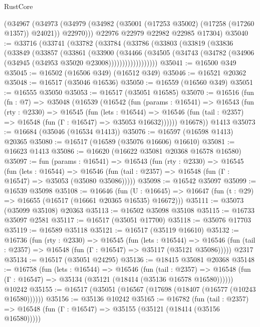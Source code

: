 \begin{lexlean}{RustCore}
\begin{coremodule}
      (@34967
        (@34973 (@34979 (@34982 (@35001 (@17253 @35002) (@17258 (@17260 @1357)) @24021)) @22970)))
      @22976
      @22979
      @22982
      @22985
      @17304)
@35040 := @33716
    (@33741
      (@33782
        (@33784
          (@33786
            (@33803
              (@33819
                (@33836
                  (@33849
                    (@33857
                      (@33861
                        (@33900
                          (@34466
                            (@34505
                              (@34743
                                (@34782 (@34906 (@34945 (@34953 @35020 @23008))))))))))))))))))
@35041 := @16500 @349
@35045 := @16502 (@16506 @349) (@16512 @349)
@35046 := @16521 @20362
@35048 := @16517 (@35046 @16536)
@35050 := @16559 (@16560 @349)
@35051 := @16555 @35050
@35053 := @16517 (@35051 @16585)
@35070 := @16516
    (fun (fn : @7) =>
    @35048
      (@16539
        (@16542
          (fun (params : @16541) =>
          @16543
            (fun (rty : @2330) =>
            @16545
              (fun (lets : @16544) =>
              @16546 (fun (tail : @2357) => @16548 (fun (Γ : @16547) => @35053 @16632))))))
        @16678))
    @1413
@35073 := @16684 (@35046 (@16534 @1413))
@35076 := @16597 (@16598 @1413) @20365
@35080 := @16517 (@16589 (@35076 @16606) @16610)
@35081 := @16623 @1413
@35086 := @16620 (@16622 @35081 @20368 @16578 @16580)
@35097 := fun (params : @16541) =>
  @16543
    (fun (rty : @2330) =>
    @16545
      (fun (lets : @16544) =>
      @16546 (fun (tail : @2357) => @16548 (fun (Γ : @16547) => @35053 (@35080 @35086)))))
@35098 := @16542 @35097
@35099 := @16539 @35098
@35108 := @16646
    (fun (U : @16645) => @16647 (fun (t : @29) => @16655 (@16517 (@16661 @20365 @16535) @16672)))
@35111 := @35073 (@35099 @35108) @20363
@35113 := @16502 @35098 @35108
@35115 := @16733 @35097 @2581
@35117 := @16517 (@35051 @17700)
@35118 := @35076 @17703
@35119 := @16589 @35118
@35121 := @16517 (@35119 @16610)
@35132 := @16736
    (fun (rty : @2330) =>
    @16545
      (fun (lets : @16544) =>
      @16546 (fun (tail : @2357) => @16548 (fun (Γ : @16547) => @35117 (@35121 @35086)))))
    @2317
@35134 := @16517 (@35051 @24295)
@35136 := @18415 @35081 @20368
@35148 := @16758
    (fun (lets : @16544) =>
    @16546
      (fun (tail : @2357) =>
      @16548 (fun (Γ : @16547) => @35134 (@35121 (@18414 (@35136 @16578 @16580))))))
    @10242
@35155 := @16517 (@35051 (@16567 (@17698 (@18407 (@16577 (@10243 @16580))))))
@35156 := @35136 @10242
@35165 := @16782
    (fun (tail : @2357) => @16548 (fun (Γ : @16547) => @35155 (@35121 (@18414 (@35156 @16580)))))

\end{coremodule}
\end{lexlean}
